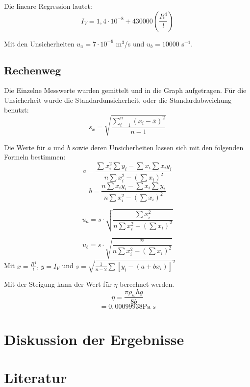 \documentclass[11pt,a4paper]{article}
\begin{document}
Die lineare Regression lautet:
$$ I_V = 1,4\cdot 10^{-8} + 430000 (\frac{R^4}{l})$$

Mit den Unsicherheiten $u_a = 7\cdot 10^{-9}$ m$^3$/s und $u_b = 10000$ s$^{-1}$. 

\begin{tcolorbox}[colback=white]
	\subsection{Rechenweg}
	Die Einzelne Messwerte wurden gemittelt und in die Graph aufgetragen. Für die Unsicherheit wurde die Standardunsicherheit, oder die Standardabweichung benutzt:
	$$s_x = \sqrt{\frac{\sum_{i=1}^{n}(x_i-\bar{x})^2}{n-1}} $$
	
	Die Werte für $a$ und $b$ sowie deren Unsicherheiten lassen sich mit den folgenden Formeln bestimmen:
	$$a = \frac{
	\sum x_i^2 \sum y_i - \sum x_i \sum x_iy_i
}{
n \sum x_i^2 - (\sum x_i)^2
}$$
$$ b = \frac{
n\sum x_iy_i-\sum x_i \sum y_i
}{
n \sum x_i^2 - (\sum x_i)^2
}$$

$$u_a = s\cdot \sqrt{
\frac{
\sum x_i^2
}{
n\sum x_i^2 - (\sum x_i)^2
}}$$

$$u_b = s\cdot \sqrt{
\frac{
n
}{
n\sum x_i^2 - (\sum x_i)^2
}}$$
Mit $x = \frac{R^4}{l}$, $y = I_V$ und $s = \sqrt{
\frac{1}{n-2}\sum [y_i-(a+bx_i)]^2}$
\end{tcolorbox}

Mit der Steigung kann der Wert für $\eta$ berechnet werden. 
$$\eta = \frac{\pi \rho_w hg}{8b}$$
$$ = 0,00099938 \textrm{Pa s} $$


\section{Diskussion der Ergebnisse}

\section{Literatur}

	
	
	
	
	
	
	
	
	
	
	
	
\end{document}
